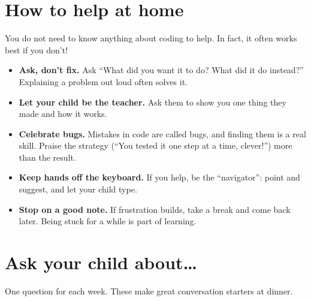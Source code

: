 \documentclass[level=1]{kidscode}
\begin{document}
\section{How to help at home}
You do not need to know anything about coding to help. In fact, it often works best if you don't!
\begin{itemize}[itemsep=3pt]
  \item \textbf{Ask, don't fix.} Ask \enquote{What did you want it to do? What did it do instead?}
        Explaining a problem out loud often solves it.
  \item \textbf{Let your child be the teacher.} Ask them to show you one thing they made and how it works.
  \item \textbf{Celebrate bugs.} Mistakes in code are called bugs, and finding them is a real skill.
        Praise the strategy (\enquote{You tested it one step at a time, clever!}) more than the result.
  \item \textbf{Keep hands off the keyboard.} If you help, be the \enquote{navigator}: point and suggest,
        and let your child type.
  \item \textbf{Stop on a good note.} If frustration builds, take a break and come back later.
        Being stuck for a while is part of learning.
\end{itemize}

\section{Ask your child about\dots}
One question for each week. These make great conversation starters at dinner.
\end{document}
